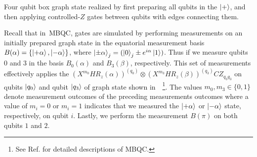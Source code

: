 \begin{marginfigure}
	\centering
    \caption[Four qubit box graph state realized by first preparing all qubits in the $\ket{+}$, and then applying controlled-$Z$ gates between qubits with edges connecting them.]{Four qubit box graph state realized by first preparing all qubits in the $\ket{+}$, and then applying controlled-$Z$ gates between qubits with edges connecting them.}
\end{marginfigure}

\bigskip
\noindent
Recall that in~\acs{MBQC}, gates are simulated by performing measurements on an initially prepared graph state in the equatorial measurement basis $B(\alpha) = \{ \ket{+\alpha},\ket{-\alpha}\}$, where $\ket{\pm \alpha}_j = (\ket{0}_j \pm e^{i\alpha}\ket{1})$. Thus if we measure qubits $0$ and $3$ in the basis $B_0(\alpha)$ and $B_3(\beta)$, respectively. This set of measurements effectively applies the $(X^{m_0} H R_z(\alpha))^{(q_0)} \otimes(X^{m_3} H R_z(\beta))^{(q_3)}CZ_{q_{0}q_{3}}$ on qubits $\ket{q_0}$ and qubit $\ket{q_3}$ of graph state shown in~~\footnote{See Ref.\cite{Jozsa_2005,Nielsen_2006,Browne_2016} for detailed descriptions of \acs{MBQC}.}. The values $m_0, m_3 \in \{0,1\}$ denote measurement outcomes of the preceding measurements outcomes where a value of $m_i=0$ or $m_i=1$ indicates that we measured the $\ket{+\alpha}$ or $\ket{-\alpha}$ state, respectively, on qubit $i$. Lastly, we perform the measurement $B(\pi)$ on both qubits $1$ and $2$. 






